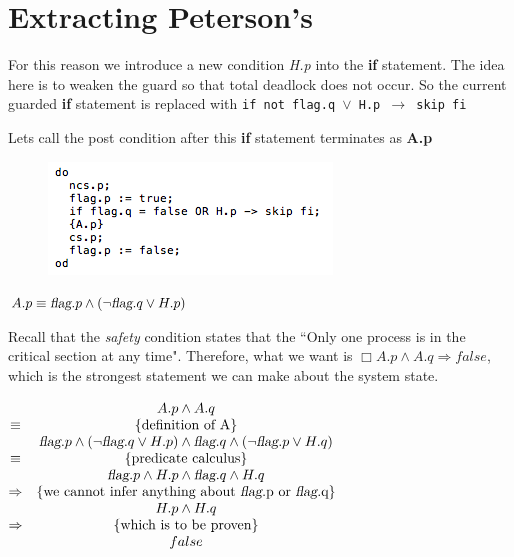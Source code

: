 \documentclass[18pt]{extarticle}
\begin{document}
\section*{Extracting Peterson's}
For this reason we introduce a new condition \textsl{H.p} into the \textbf{if} statement. The idea here is to weaken the guard so that total deadlock does not occur. \newline \newline
So the current guarded \textbf{if} statement is replaced with \texttt{if not flag.q $\lor$ H.p $\rightarrow$ skip fi} \newline

Lets call the post condition after this \textbf{if} statement terminates as \textbf{A.p} \newline 

\begin{figure}[h]
  \includegraphics[scale=0.7]{2}
  \label{fig: version2}
\end{figure}

$ A.p \equiv \textsl{flag}.p \land (\neg \textsl{flag}.q \lor H.p) $ \newline

Recall that the \textit{safety} condition states that the ``Only one process is in the critical section at any time". \newline
Therefore, what we want is $\Box A.p \land A.q \Rightarrow false$, which is the strongest statement we can make about the system state. \newline

$
\begin{matrix}
        & A.p \wedge A.q \\
       \equiv & \{\mbox{definition of A}\} \\
        & \textsl{flag}.p \wedge (\neg \textsl{flag}.q \vee H.p) \wedge \textsl{flag}.q \wedge (\neg \textsl{flag}.p \vee H.q) \\
       \equiv & \{\mbox{predicate calculus}\} \\
        & \textsl{flag}.p \wedge H.p \wedge \textsl{flag}.q \wedge H.q\\
       \Rightarrow & \{\mbox{we cannot infer anything about \textsl{flag}.p or \textsl{flag}.q}\} \\
        & H.p \wedge H.q \\
       \Rightarrow & \{\mbox{which is to be proven}\} \\
        & false 
\end{matrix}
$
\end{document}
